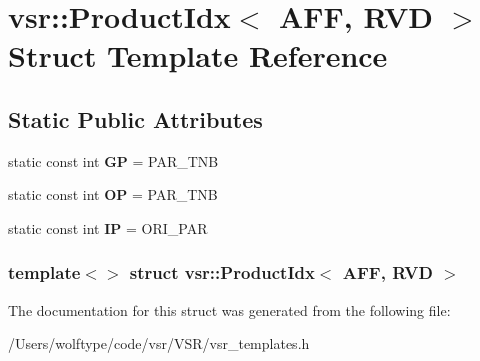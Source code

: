 \hypertarget{structvsr_1_1_product_idx_3_01_a_f_f_00_01_r_v_d_01_4}{\section{vsr\-:\-:Product\-Idx$<$ A\-F\-F, R\-V\-D $>$ Struct Template Reference}
\label{structvsr_1_1_product_idx_3_01_a_f_f_00_01_r_v_d_01_4}
}
\subsection*{Static Public Attributes}
\begin{DoxyCompactItemize}
\item 
\hypertarget{structvsr_1_1_product_idx_3_01_a_f_f_00_01_r_v_d_01_4_a78180a0fdabc38bea8227ce05aa6d065}{static const int {\bfseries G\-P} = P\-A\-R\-\_\-\-T\-N\-B}\label{structvsr_1_1_product_idx_3_01_a_f_f_00_01_r_v_d_01_4_a78180a0fdabc38bea8227ce05aa6d065}

\item 
\hypertarget{structvsr_1_1_product_idx_3_01_a_f_f_00_01_r_v_d_01_4_a4cb9952af8154fa1a73483fd26a1f0ff}{static const int {\bfseries O\-P} = P\-A\-R\-\_\-\-T\-N\-B}\label{structvsr_1_1_product_idx_3_01_a_f_f_00_01_r_v_d_01_4_a4cb9952af8154fa1a73483fd26a1f0ff}

\item 
\hypertarget{structvsr_1_1_product_idx_3_01_a_f_f_00_01_r_v_d_01_4_aa001b430cd146cfd283437f15532a838}{static const int {\bfseries I\-P} = O\-R\-I\-\_\-\-P\-A\-R}\label{structvsr_1_1_product_idx_3_01_a_f_f_00_01_r_v_d_01_4_aa001b430cd146cfd283437f15532a838}

\end{DoxyCompactItemize}
\subsubsection*{template$<$$>$ struct vsr\-::\-Product\-Idx$<$ A\-F\-F, R\-V\-D $>$}



The documentation for this struct was generated from the following file\-:\begin{DoxyCompactItemize}
\item 
/\-Users/wolftype/code/vsr/\-V\-S\-R/vsr\-\_\-templates.\-h\end{DoxyCompactItemize}
